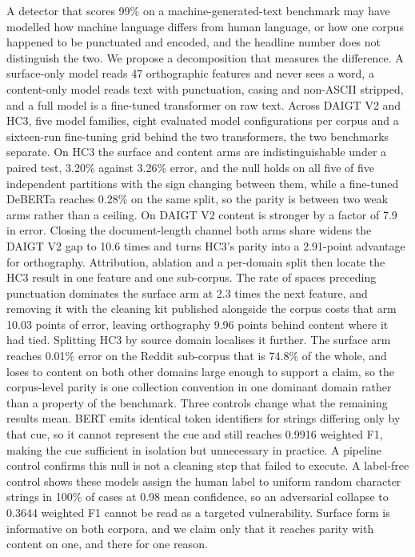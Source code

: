 A detector that scores 99\% on a machine-generated-text benchmark may have modelled how machine language differs from human language, or how one corpus happened to be punctuated and encoded, and the headline number does not distinguish the two. We propose a decomposition that measures the difference. A surface-only model reads 47 orthographic features and never sees a word, a content-only model reads text with punctuation, casing and non-ASCII stripped, and a full model is a fine-tuned transformer on raw text. Across DAIGT V2 and HC3, five model families, eight evaluated model configurations per corpus and a sixteen-run fine-tuning grid behind the two transformers, the two benchmarks separate. On HC3 the surface and content arms are indistinguishable under a paired test, 3.20\% against 3.26\% error, and the null holds on all five of five independent partitions with the sign changing between them, while a fine-tuned DeBERTa reaches 0.28\% on the same split, so the parity is between two weak arms rather than a ceiling. On DAIGT V2 content is stronger by a factor of 7.9 in error. Closing the document-length channel both arms share widens the DAIGT V2 gap to 10.6 times and turns HC3's parity into a 2.91-point advantage for orthography. Attribution, ablation and a per-domain split then locate the HC3 result in one feature and one sub-corpus. The rate of spaces preceding punctuation dominates the surface arm at 2.3 times the next feature, and removing it with the cleaning kit published alongside the corpus costs that arm 10.03 points of error, leaving orthography 9.96 points behind content where it had tied. Splitting HC3 by source domain localises it further. The surface arm reaches 0.01\% error on the Reddit sub-corpus that is 74.8\% of the whole, and loses to content on both other domains large enough to support a claim, so the corpus-level parity is one collection convention in one dominant domain rather than a property of the benchmark. Three controls change what the remaining results mean. BERT emits identical token identifiers for strings differing only by that cue, so it cannot represent the cue and still reaches 0.9916 weighted F1, making the cue sufficient in isolation but unnecessary in practice. A pipeline control confirms this null is not a cleaning step that failed to execute. A label-free control shows these models assign the human label to uniform random character strings in 100\% of cases at 0.98 mean confidence, so an adversarial collapse to 0.3644 weighted F1 cannot be read as a targeted vulnerability. Surface form is informative on both corpora, and we claim only that it reaches parity with content on one, and there for one reason.
